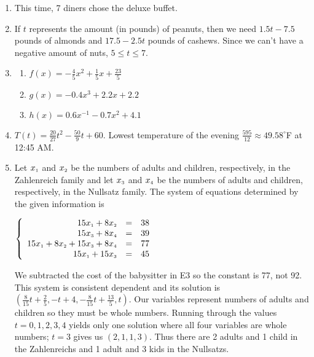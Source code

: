 \begin{enumerate}
\setcounter{enumi}{\value{HW}}

\item  This time, 7 diners chose the deluxe buffet.

\item  If $t$ represents the amount (in pounds) of peanuts, then we need $1.5 t - 7.5$ pounds of almonds and $17.5 - 2.5t$ pounds of cashews.  Since we can't have a negative amount of nuts, $5 \leq t \leq 7$. 

\item 

\begin{multicols}{3}

 \begin{enumerate}

\item $f(x) = -\frac{4}{5} x^2+\frac{1}{5} x + \frac{23}{5}$

\item  $g(x) = -0.4 x^3 + 2.2 x + 2.2$

\item $h(x) = 0.6 x^{-1} - 0.7 x^2 + 4.1$

\end{enumerate}

\end{multicols}

\item  $T(t) = \frac{20}{27} t^2 - \frac{50}{9} t + 60$.  Lowest temperature of the evening $\frac{595}{12} \approx 49.58^{\circ}$F at 12:45 AM.

\newpage

\item Let $x_{\mbox{\tiny$1$}}$ and $x_{\mbox{\tiny$2$}}$ be the numbers of adults and children, respectively, in the Zahlenreich family and let $x_{\mbox{\tiny$3$}}$ and $x_{\mbox{\tiny$4$}}$ be the numbers of adults and children, respectively, in the Nullsatz family.  The system of equations determined by the given information is 

$\left\{ \begin{array}{rcr} 15x_{\mbox{\tiny$1$}} + 8x_{\mbox{\tiny$2$}} & = & 38 \\ 
15x_{\mbox{\tiny$3$}} + 8x_{\mbox{\tiny$4$}} & = & 39  \\  
15x_{\mbox{\tiny$1$}} +  8x_{\mbox{\tiny$2$}} + 15x_{\mbox{\tiny$3$}} + 8x_{\mbox{\tiny$4$}} & = & 77 \\
15x_{\mbox{\tiny$1$}} + 15x_{\mbox{\tiny$3$}} & = & 45  \end{array} \right.$

We subtracted the cost of the babysitter in E3 so the constant is 77, not 92.  This system is consistent dependent and its solution is $\left(\frac{8}{15}t + \frac{2}{5}, -t + 4, -\frac{8}{15}t + \frac{13}{5}, t \right)$.  Our variables represent numbers of adults and children so they must be whole numbers.  Running through the values $t = 0, 1, 2, 3, 4$ yields only one solution where all four variables are whole numbers; $t = 3$ gives us $(2, 1, 1, 3)$.  Thus there are 2 adults and 1 child in the Zahlenreichs and 1 adult and 3 kids in the Nullsatzs.


\end{enumerate}